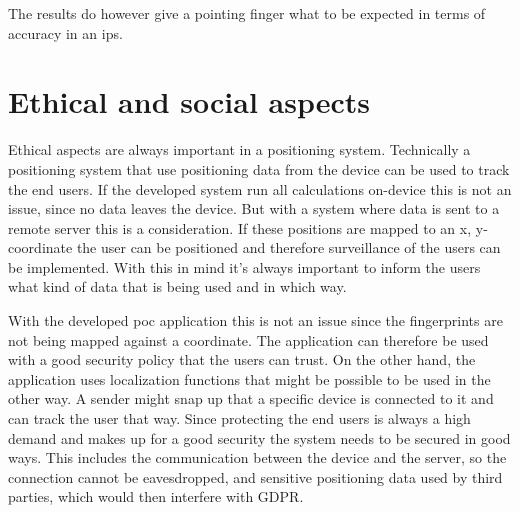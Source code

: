 \bigskip


\bigskip


\bigskip

The results do however give a pointing finger what to be expected in terms of accuracy in an \acrshort{ips}.


\section{Ethical and social aspects}\label{sec:discussionAspects}
Ethical aspects are always important in a positioning system.
Technically a positioning system that use positioning data from the device can be used to track the end users.
If the developed system run all calculations on-device this is not an issue, since no data leaves the device.
But with a system where data is sent to a remote server this is a consideration.
If these positions are mapped to an x, y-coordinate the user can be positioned and therefore surveillance of the users can be implemented.
With this in mind it's always important to inform the users what kind of data that is being used and in which way.

\bigskip

With the developed \acrshort{poc} application this is not an issue since the fingerprints are not being mapped against a coordinate.
The application can therefore be used with a good security policy that the users can trust.
On the other hand, the application uses localization functions that might be possible to be used in the other way.
A sender might snap up that a specific device is connected to it and can track the user that way.
Since protecting the end users is always a high demand and makes up for a good security the system needs to be secured in good ways.
This includes the communication between the device and the server, so the connection cannot be eavesdropped, and sensitive positioning data used by third parties, which would then interfere with GDPR.

